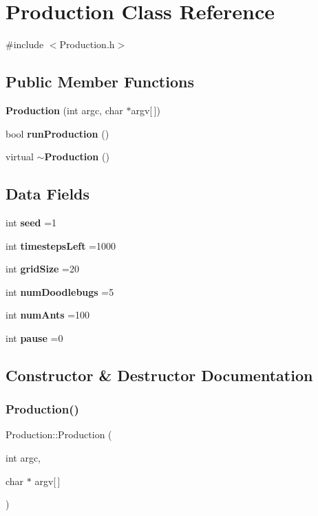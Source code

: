 \section{Production Class Reference}
\label{classProduction}


{\ttfamily \#include $<$Production.\+h$>$}

\subsection*{Public Member Functions}
\begin{DoxyCompactItemize}
\item 
\textbf{ Production} (int argc, char $\ast$argv[$\,$])
\item 
bool \textbf{ run\+Production} ()
\item 
virtual \textbf{ $\sim$\+Production} ()
\end{DoxyCompactItemize}
\subsection*{Data Fields}
\begin{DoxyCompactItemize}
\item 
int \textbf{ seed} =1
\item 
int \textbf{ timesteps\+Left} =1000
\item 
int \textbf{ grid\+Size} =20
\item 
int \textbf{ num\+Doodlebugs} =5
\item 
int \textbf{ num\+Ants} =100
\item 
int \textbf{ pause} =0
\end{DoxyCompactItemize}


\subsection{Constructor \& Destructor Documentation}
\mbox{\label{classProduction_a24439558b7672feaea80dc0ab1b53ff2}} 
\subsubsection{Production()}
{\footnotesize\ttfamily Production\+::\+Production (\begin{DoxyParamCaption}\item[{int}]{argc,  }\item[{char $\ast$}]{argv[$\,$] }\end{DoxyParamCaption})}



